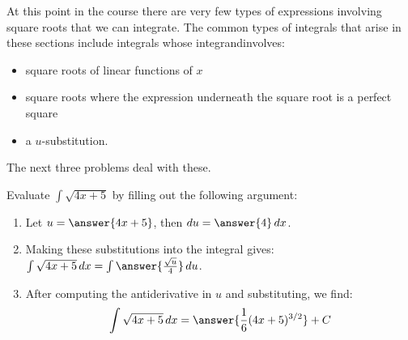 \documentclass{ximera}
\begin{document}
\begin{problem}
  At this point in the course there are very few types of expressions involving square roots that we can integrate.  The common types of integrals that arise in these sections include integrals whose integrand​ involves:
  \begin{itemize}
    \item
      square roots of linear functions of $x$
      
    \item
      square roots where the expression underneath the square root is a perfect square
    
    \item
      a $u$-substitution.
  \end{itemize}
  
  The next three problems deal with these.
  
  \begin{multipleChoice}
  \end{multipleChoice}
\end{problem}

\begin{problem}
  Evaluate $\int \sqrt{4x + 5}$ by filling out the following argument:
  \begin{enumerate}
    \item Let $u = \answer{4x + 5}$, then $\d u = \answer{4} \d x$.
    \item Making these substitutions into the integral gives: $\int \sqrt{4x + 5} \d x = \int \answer{\frac{\sqrt{u}}{4}} \d u$.
    \item After computing the antiderivative in $u$ and substituting, we find:
    \[
      \int \sqrt{4x + 5} \d x = \answer{\frac{1}{6}(4x+5)^{3/2}} + C
    \]
  \end{enumerate}
\end{problem}
\end{document}
